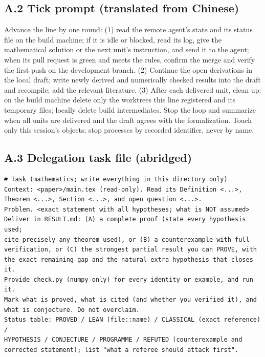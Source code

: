\documentclass[11pt]{article}
\begin{document}
\subsection*{A.2 Tick prompt (translated from Chinese)}
\begin{small}
Advance the line by one round: (1) read the remote agent's state and its
status file on the build machine; if it is idle or blocked, read its log,
give the mathematical solution or the next unit's instruction, and send it to
the agent; when its pull request is green and meets the rules, confirm the
merge and verify the first push on the development branch. (2) Continue the
open derivations in the local draft; write newly derived and numerically
checked results into the draft and recompile; add the relevant literature.
(3) After each delivered unit, clean up: on the build machine delete only the
worktrees this line registered and its temporary files; locally delete build
intermediates. Stop the loop and summarize when all units are delivered and
the draft agrees with the formalization. Touch only this session's objects;
stop processes by recorded identifier, never by name.
\end{small}

\subsection*{A.3 Delegation task file (abridged)}
\begin{small}
\begin{verbatim}
# Task (mathematics; write everything in this directory only)
Context: <paper>/main.tex (read-only). Read its Definition <...>,
Theorem <...>, Section <...>, and open question <...>.
Problem. <exact statement with all hypotheses; what is NOT assumed>
Deliver in RESULT.md: (A) a complete proof (state every hypothesis used;
cite precisely any theorem used), or (B) a counterexample with full
verification, or (C) the strongest partial result you can PROVE, with
the exact remaining gap and the natural extra hypothesis that closes it.
Provide check.py (numpy only) for every identity or example, and run it.
Mark what is proved, what is cited (and whether you verified it), and
what is conjecture. Do not overclaim.
Status table: PROVED / LEAN (file::name) / CLASSICAL (exact reference) /
HYPOTHESIS / CONJECTURE / PROGRAMME / REFUTED (counterexample and
corrected statement); list "what a referee should attack first".
\end{verbatim}
\end{small}
\end{document}
